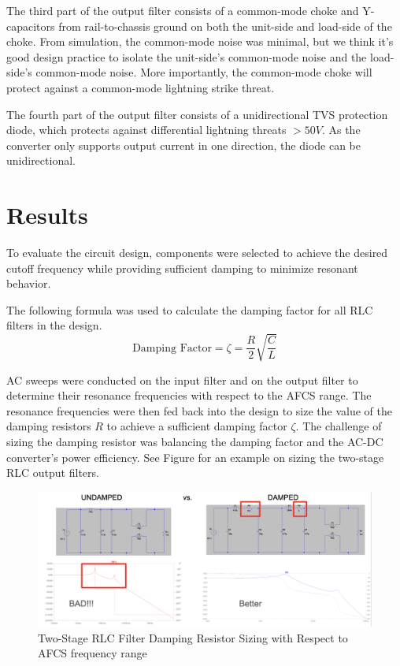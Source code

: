 \documentclass[conference]{IEEEtran}
\begin{document}
The third part of the output filter consists of a common-mode choke and Y-capacitors from rail-to-chassis ground on both the unit-side and load-side of the choke. From simulation, the common-mode noise was minimal, but we think it's good design practice to isolate the unit-side's common-mode noise and the load-side's common-mode noise. More importantly, the common-mode choke will protect against a common-mode lightning strike threat.

The fourth part of the output filter consists of a unidirectional TVS protection diode, which protects against differential lightning threats $>50V$. As the converter only supports output current in one direction, the diode can be unidirectional.

\section{Results}
To evaluate the circuit design, components were selected to achieve the desired cutoff frequency while providing sufficient damping to minimize resonant behavior.

The following formula was used to calculate the damping factor for all RLC filters in the design.
$$ \text{Damping Factor} = \zeta = \frac{R}{2} \sqrt{\frac{C}{L}}$$

AC sweeps were conducted on the input filter and on the output filter to determine their resonance frequencies with respect to the AFCS range. The resonance frequencies were then fed back into the design to size the value of the damping resistors $R$ to achieve a sufficient damping factor $\zeta$. The challenge of sizing the damping resistor was balancing the damping factor and the AC-DC converter's power efficiency. See Figure for an example on sizing the two-stage RLC output filters.

\begin{figure}[htp]
    \centering
    \includegraphics[width=1.0\linewidth]{resonance_frequency_design_feedback_results.png}
    \caption{Two-Stage RLC Filter Damping Resistor Sizing with Respect to AFCS frequency range}
    \label{fig:resonance_frequency_design_feedback_results_waveform}
\end{figure}
\end{document}
